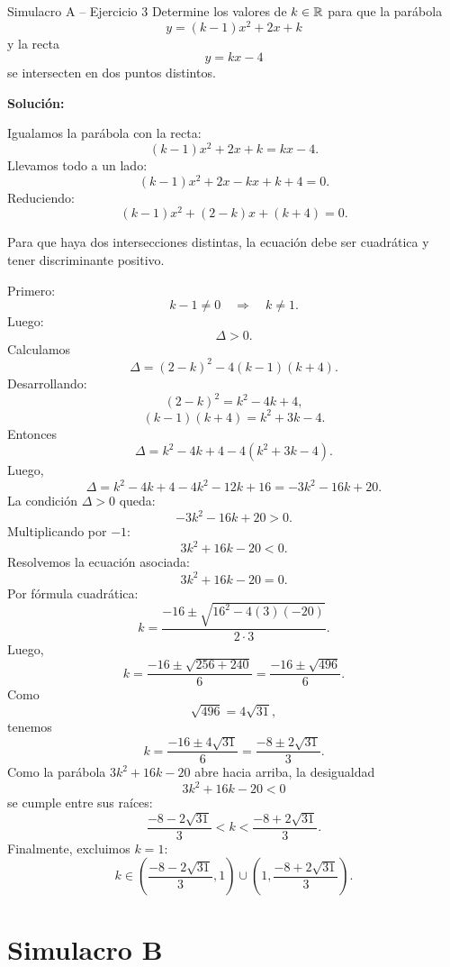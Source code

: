 \documentclass[letterpaper, 12pt]{article}
\begin{document}
\begin{solucionbox}{Simulacro A -- Ejercicio 3}
Determine los valores de $k\in\mathbb{R}$ para que la par\'abola
\[
    y=(k-1)x^2+2x+k
\]
y la recta
\[
    y=kx-4
\]
se intersecten en dos puntos distintos.

\textbf{Soluci\'on:}

Igualamos la par\'abola con la recta:
\[
    (k-1)x^2+2x+k=kx-4.
\]
Llevamos todo a un lado:
\[
    (k-1)x^2+2x-kx+k+4=0.
\]
Reduciendo:
\[
    (k-1)x^2+(2-k)x+(k+4)=0.
\]

Para que haya dos intersecciones distintas, la ecuaci\'on debe ser cuadr\'atica y tener discriminante positivo.

Primero:
\[
    k-1\neq0
    \quad\Longrightarrow\quad
    k\neq1.
\]
Luego:
\[
    \Delta>0.
\]
Calculamos
\[
    \Delta=(2-k)^2-4(k-1)(k+4).
\]
Desarrollando:
\[
    (2-k)^2=k^2-4k+4,
\]
\[
    (k-1)(k+4)=k^2+3k-4.
\]
Entonces
\[
    \Delta=k^2-4k+4-4(k^2+3k-4).
\]
Luego,
\[
    \Delta=k^2-4k+4-4k^2-12k+16
    =-3k^2-16k+20.
\]
La condici\'on $\Delta>0$ queda:
\[
    -3k^2-16k+20>0.
\]
Multiplicando por $-1$:
\[
    3k^2+16k-20<0.
\]
Resolvemos la ecuaci\'on asociada:
\[
    3k^2+16k-20=0.
\]
Por f\'ormula cuadr\'atica:
\[
    k=\frac{-16\pm\sqrt{16^2-4(3)(-20)}}{2\cdot3}.
\]
Luego,
\[
    k=\frac{-16\pm\sqrt{256+240}}{6}
     =\frac{-16\pm\sqrt{496}}{6}.
\]
Como
\[
    \sqrt{496}=4\sqrt{31},
\]
tenemos
\[
    k=\frac{-16\pm4\sqrt{31}}{6}
     =\frac{-8\pm2\sqrt{31}}{3}.
\]
Como la par\'abola $3k^2+16k-20$ abre hacia arriba, la desigualdad
\[
    3k^2+16k-20<0
\]
se cumple entre sus ra\'ices:
\[
    \frac{-8-2\sqrt{31}}{3}<k<\frac{-8+2\sqrt{31}}{3}.
\]
Finalmente, excluimos $k=1$:
\[
    k\in\left(\frac{-8-2\sqrt{31}}{3},1\right)
    \cup
    \left(1,\frac{-8+2\sqrt{31}}{3}\right).
\]

\end{solucionbox}

\newpage
\section*{Simulacro B}
\end{document}
